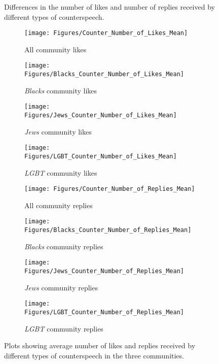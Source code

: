 \documentclass[11pt,a4paper]{article}
\begin{document}
{\begin{figure*}[h]
	\caption{Differences in the number of likes and number of replies received by different types of counterspeech.} 

\end{figure*}
\fi



\begin{figure*}
\begin{subfigure}{.24\textwidth}
  \centering
  \texttt{[image: Figures/Counter\_Number\_of\_Likes\_Mean]}
  \caption{All community likes}
  \label{fig:sfig1}
\end{subfigure}\fi
\begin{subfigure}{.33\textwidth}
  \centering
  \texttt{[image: Figures/Blacks\_Counter\_Number\_of\_Likes\_Mean]}
  \caption{{\sl Blacks} community likes}
  \label{fig:sfig2}
\end{subfigure}\begin{subfigure}{.33\textwidth}
  \centering
  \texttt{[image: Figures/Jews\_Counter\_Number\_of\_Likes\_Mean]}
  \caption{{\sl Jews} community likes}
  \label{fig:sfig3}
\end{subfigure}\begin{subfigure}{.33\textwidth}
  \centering
  \texttt{[image: Figures/LGBT\_Counter\_Number\_of\_Likes\_Mean]}
  \caption{{\sl LGBT} community likes}
  \label{fig:sfig4}
\end{subfigure}

\begin{subfigure}{.24\textwidth}
  \centering
  \texttt{[image: Figures/Counter\_Number\_of\_Replies\_Mean]}
  \caption{All community replies}
  \label{fig:sfig5}
\end{subfigure}\fi
\begin{subfigure}{.33\textwidth}
  \centering
  \texttt{[image: Figures/Blacks\_Counter\_Number\_of\_Replies\_Mean]}
  \caption{{\sl Blacks} community replies}
  \label{fig:sfig6}
\end{subfigure}\begin{subfigure}{.33\textwidth}
  \centering
  \texttt{[image: Figures/Jews\_Counter\_Number\_of\_Replies\_Mean]}
  \caption{{\sl Jews} community replies}
  \label{fig:sfig7}
\end{subfigure}\begin{subfigure}{.33\textwidth}
  \centering
  \texttt{[image: Figures/LGBT\_Counter\_Number\_of\_Replies\_Mean]}
  \caption{{\sl LGBT} community replies}
  \label{fig:sfig8}
\end{subfigure}\caption{Plots showing average number of likes and replies received by different types of counterspeech in the three communities.}
\label{fig:fig}
\vspace{-5mm}
\end{figure*}









}
\end{document}
